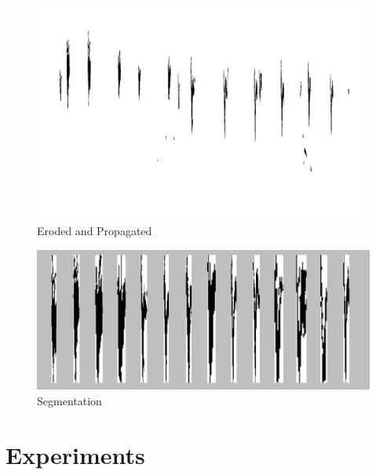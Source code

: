 \documentclass[12pt,peerreview,letterpaper]{IEEEtran}
\begin{document}
\begin{figure}[tb]
	\begin{center}
		\includegraphics[scale = 0.2]{"Eroded_and_propagated"}
	\end{center}
	\caption{Eroded and Propagated}
	\label{fig:Eroded and Propagated}
\end{figure}

\begin{figure}[tb]
	\begin{center}
		\includegraphics[scale = 0.4]{"segmented"}
	\end{center}
	\caption{Segmentation}
	\label{fig:Segmentation}
\end{figure}


\section{Experiments}





\end{document}
